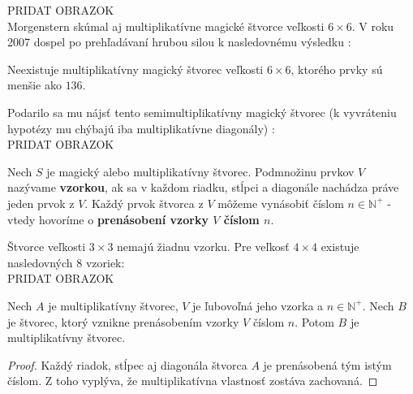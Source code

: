 PRIDAT OBRAZOK \\

Morgenstern skúmal aj multiplikatívne magické štvorce veľkosti $6 \times 6$. V roku 2007 dospel po prehľadávaní hrubou silou k nasledovnému výsledku \cite{multimagie}:

\begin{theorem} Neexistuje multiplikatívny magický štvorec veľkosti $6 \times 6$, ktorého prvky sú menšie ako $136$.
\end{theorem}

Podarilo sa mu nájsť tento semimultiplikatívny magický štvorec (k vyvráteniu hypotézy mu chýbajú iba multiplikatívne diagonály) \cite{multimagie}: \\

PRIDAT OBRAZOK \\

\begin{definition} Nech $S$ je magický alebo multiplikatívny štvorec. Podmnožinu prvkov $V$ nazývame \textbf{vzorkou}, ak sa v každom riadku, stĺpci a diagonále nachádza práve jeden prvok z $V$. Každý prvok štvorca z $V$ môžeme vynásobiť číslom $n \in \mathbb{N^+}$ - vtedy hovoríme o \textbf{prenásobení vzorky $V$ číslom $n$}.
\end{definition}

Štvorce veľkosti $3 \times 3$ nemajú žiadnu vzorku. Pre veľkosť $4 \times 4$ existuje nasledovných $8$ vzoriek: \\

PRIDAT OBRAZOK \\

\begin{theorem}
\label{addmultsquarepattern}
Nech $A$ je multiplikatívny štvorec, $V$ je ľubovoľná jeho vzorka a $n \in \mathbb{N^+}$. Nech $B$ je štvorec, ktorý vznikne prenásobením vzorky $V$ číslom $n$. Potom $B$ je multiplikatívny štvorec.
\end{theorem}

\begin{proof} Každý riadok, stĺpec aj diagonála štvorca $A$ je prenásobená tým istým číslom. Z toho vyplýva, že multiplikatívna vlastnosť zostáva zachovaná.
\end{proof}

